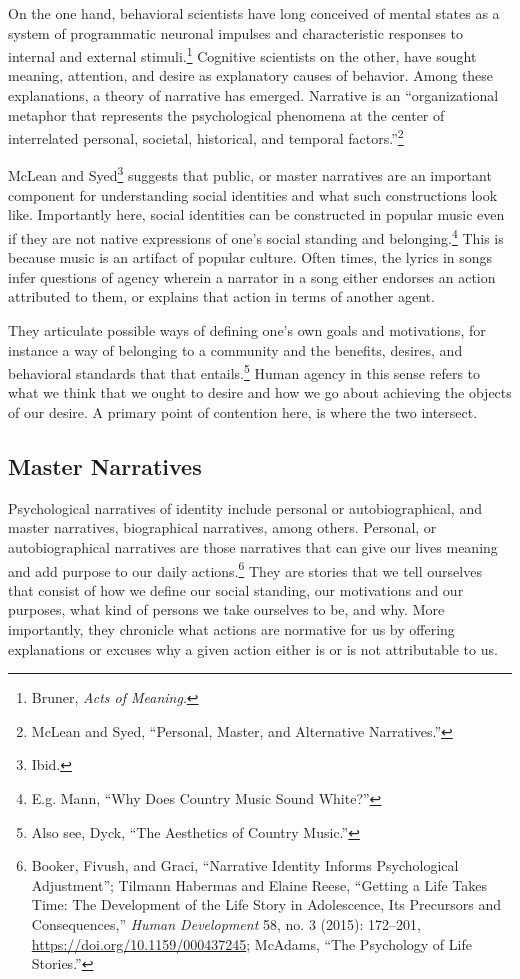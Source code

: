 \documentclass[phdthesis,12pt,final,a4paper]{wuthesis}
\theoremstyle{definition}
\theoremstyle{definition}
\theoremstyle{definition}
\theoremstyle{definition}
\theoremstyle{remark}
\begin{document}
On the one hand, behavioral scientists have long conceived of mental states as a system of programmatic neuronal impulses and characteristic responses to internal and external stimuli.\footnote{Bruner, \emph{Acts of Meaning}.} Cognitive scientists on the other, have sought meaning, attention, and desire as explanatory causes of behavior. Among these explanations, a theory of narrative has emerged. Narrative is an ``organizational metaphor that represents the psychological phenomena at the center of interrelated personal, societal, historical, and temporal factors.''\footnote{McLean and Syed, {``Personal, {Master}, and {Alternative Narratives}.''}}

McLean and Syed\footnote{Ibid.} suggests that public, or master narratives are an important component for understanding social identities and what such constructions look like. Importantly here, social identities can be constructed in popular music even if they are not native expressions of one's social standing and belonging.\footnote{E.g. Mann, {``Why Does Country Music Sound White?''}} This is because music is an artifact of popular culture. Often times, the lyrics in songs infer questions of agency wherein a narrator in a song either endorses an action attributed to them, or explains that action in terms of another agent.

They articulate possible ways of defining one's own goals and motivations, for instance a way of belonging to a community and the benefits, desires, and behavioral standards that that entails.\footnote{Also see, Dyck, {``The Aesthetics of Country Music.''}} Human agency in this sense refers to what we think that we ought to desire and how we go about achieving the objects of our desire. A primary point of contention here, is where the two intersect.

\subsection*{Master Narratives}\label{master-narratives}

Psychological narratives of identity include personal or autobiographical, and master narratives, biographical narratives, among others. Personal, or autobiographical narratives are those narratives that can give our lives meaning and add purpose to our daily actions.\footnote{Booker, Fivush, and Graci, {``Narrative Identity Informs Psychological Adjustment''}; Tilmann Habermas and Elaine Reese, {``Getting a Life Takes Time: The Development of the Life Story in Adolescence, Its Precursors and Consequences,''} \emph{Human Development} 58, no. 3 (2015): 172--201, \url{https://doi.org/10.1159/000437245}; McAdams, {``The {Psychology} of {Life Stories}.''}} They are stories that we tell ourselves that consist of how we define our social standing, our motivations and our purposes, what kind of persons we take ourselves to be, and why. More importantly, they chronicle what actions are normative for us by offering explanations or excuses why a given action either is or is not attributable to us.
\end{document}
